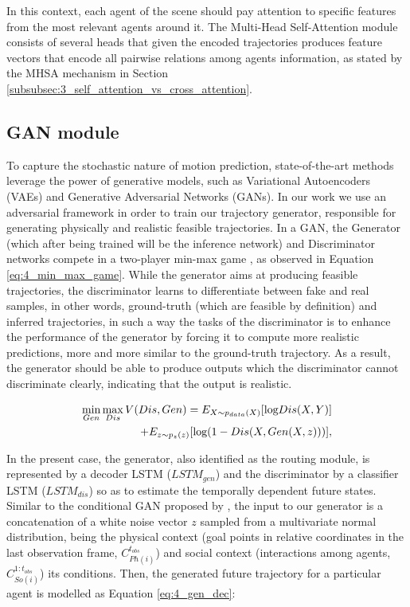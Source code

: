 In this context, each agent of the scene should pay attention to specific features from the most relevant agents around it. The Multi-Head Self-Attention module consists of several heads that given the encoded trajectories produces feature vectors that encode all pairwise relations among agents information, as stated by the MHSA mechanism in Section \ref{subsubsec:3_self_attention_vs_cross_attention}. %

\subsection{GAN module}
\label{subsec:5_gan_module}

To capture the stochastic nature of motion prediction, state-of-the-art methods leverage the power of generative models, such as Variational Autoencoders (VAEs) and Generative Adversarial Networks (GANs). In our work we use an adversarial framework in order to train our trajectory generator, responsible for generating physically and realistic feasible trajectories. In a GAN, the Generator (which after being trained will be the inference network) and Discriminator networks compete in a two-player min-max game \cite{goodfellow2020generative}, as observed in Equation \ref{eq:4_min_max_game}. While the generator aims at producing feasible trajectories, the discriminator learns to differentiate between fake and real samples, in other words, ground-truth (which are feasible by definition) and inferred trajectories, in such a way the tasks of the discriminator is to enhance the performance of the generator by forcing it to compute more realistic predictions, more and more similar to the ground-truth trajectory. As a result, the generator should be able to produce outputs which the discriminator cannot discriminate clearly, indicating that the output is realistic. 

\begin{eqnarray}
	\label{eq:4_min_max_game}
	&&\hspace{-10mm} \min_{Gen} \max_{Dis} V(Dis, Gen)=E_{X \sim p_{data}(X)}[\mbox{log} Dis(X,Y)] \nonumber \\
	&&\hspace{15mm} + E_{z \sim p_z(z)}[\mbox{log} (1 - Dis(X, Gen(X,z)))],
\end{eqnarray}

In the present case, the generator, also identified as the routing module, is represented by a decoder LSTM  ($LSTM_{gen}$) and the discriminator by a classifier LSTM ($LSTM_{dis}$) so as to estimate the temporally dependent future states. Similar to the conditional GAN proposed by \cite{sadeghian2019sophie}, the input to our generator is a concatenation of a white noise vector $z$ sampled from a multivariate normal distribution, being the physical context (goal points in relative coordinates in the last observation frame, $C_{Ph(i)}^{t_{obs}}$) and social context (interactions among agents, $C_{So(i)}^{1:t_{obs}}$) its conditions. Then, the generated future trajectory for a particular agent is modelled as Equation \ref{eq:4_gen_dec}:


